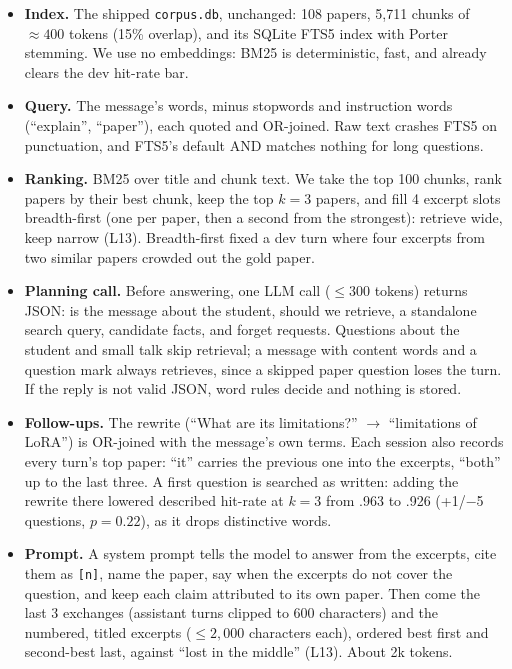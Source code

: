 \documentclass[10pt,letterpaper]{article}
\newcommand{\code}[1]{\texttt{#1}}
\begin{document}
\begin{itemize}
  \item \textbf{Index.} The shipped \code{corpus.db}, unchanged: 108 papers, 5{,}711 chunks of
    ${\approx}400$ tokens (15\% overlap), and its SQLite FTS5 index with Porter stemming. We use
    no embeddings: BM25 is deterministic, fast, and already clears the dev hit-rate bar.
  \item \textbf{Query.} The message's words, minus stopwords and instruction words
    (``explain'', ``paper''), each quoted and OR-joined. Raw text crashes FTS5 on punctuation,
    and FTS5's default AND matches nothing for long questions.
  \item \textbf{Ranking.} BM25 over title and chunk text. We take the top 100 chunks, rank papers
    by their best chunk, keep the top $k{=}3$ papers, and fill 4 excerpt slots breadth-first
    (one per paper, then a second from the strongest): retrieve wide, keep narrow (L13).
    Breadth-first fixed a dev turn where four excerpts from two similar papers crowded out the
    gold paper.
  \item \textbf{Planning call.} Before answering, one LLM call (${\le}300$ tokens) returns JSON:
    is the message about the student, should we retrieve, a standalone search query, candidate
    facts, and forget requests. Questions about the student and small talk skip retrieval; a
    message with content words and a question mark always retrieves, since a skipped paper
    question loses the turn. If the reply is not valid JSON, word rules decide and nothing is stored.
  \item \textbf{Follow-ups.} The rewrite (``What are its limitations?'' $\to$ ``limitations of
    LoRA'') is OR-joined with the message's own terms. Each session also records every turn's top
    paper: ``it'' carries the previous one into the excerpts, ``both'' up to the last three.
    A first question is searched as written: adding the rewrite there lowered described hit-rate
    at $k{=}3$ from .963 to .926 (+1/$-$5 questions, $p{=}0.22$), as it drops distinctive words.
  \item \textbf{Prompt.} A system prompt tells the model to answer from the excerpts, cite them
    as \code{[n]}, name the paper, say when the excerpts do not cover the question, and keep each
    claim attributed to its own paper. Then come the last 3 exchanges (assistant turns clipped to
    600 characters) and the numbered, titled excerpts (${\le}2{,}000$ characters each), ordered
    best first and second-best last, against ``lost in the middle'' (L13). About 2k tokens.

\end{itemize}
\end{document}
